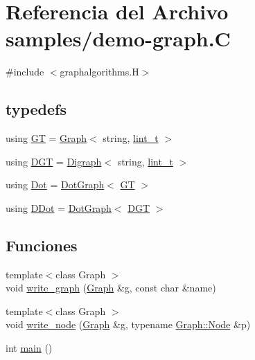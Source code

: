 \hypertarget{demo-graph_8_c}{}\section{Referencia del Archivo samples/demo-\/graph.C}
\label{demo-graph_8_c}
{\ttfamily \#include $<$graphalgorithms.\+H$>$}\newline
\subsection*{typedefs}
\begin{DoxyCompactItemize}
\item 
using \hyperlink{demo-graph_8_c_aa29146ba261a2a26fce51cbd8557db3b}{GT} = \hyperlink{class_designar_1_1_graph}{Graph}$<$ string, \hyperlink{namespace_designar_a9d113d66a39e82b73727c72cd3a52f73}{lint\+\_\+t} $>$
\item 
using \hyperlink{demo-graph_8_c_a6b9eddfa4274f215240c1c90be9df2dc}{D\+GT} = \hyperlink{class_designar_1_1_digraph}{Digraph}$<$ string, \hyperlink{namespace_designar_a9d113d66a39e82b73727c72cd3a52f73}{lint\+\_\+t} $>$
\item 
using \hyperlink{demo-graph_8_c_a70657b0b48a4d69ef850be3c5517ecc2}{Dot} = \hyperlink{class_designar_1_1_dot_graph}{Dot\+Graph}$<$ \hyperlink{demo-buildgraph_8_c_a3001c40d2c31ca87ed96cd7d1334a55e}{GT} $>$
\item 
using \hyperlink{demo-graph_8_c_a0ffdd103a7285712ccbd9548ff5544e7}{D\+Dot} = \hyperlink{class_designar_1_1_dot_graph}{Dot\+Graph}$<$ \hyperlink{demo-buildgraph_8_c_ae73e956c2a8cf0a58255aa6b659985e0}{D\+GT} $>$
\end{DoxyCompactItemize}
\subsection*{Funciones}
\begin{DoxyCompactItemize}
\item 
{\footnotesize template$<$class Graph $>$ }\\void \hyperlink{demo-graph_8_c_a75dee8f1e6289c0fbd2060e643605bfe}{write\+\_\+graph} (\hyperlink{class_designar_1_1_graph}{Graph} \&g, const char \&name)
\item 
{\footnotesize template$<$class Graph $>$ }\\void \hyperlink{demo-graph_8_c_abe260b66e94b606f11fd75beedd0f6dc}{write\+\_\+node} (\hyperlink{class_designar_1_1_graph}{Graph} \&g, typename \hyperlink{class_designar_1_1_graph_a5dfc7dba9d092ac489c72e40390c37d0}{Graph\+::\+Node} \&p)
\item 
int \hyperlink{demo-graph_8_c_ae66f6b31b5ad750f1fe042a706a4e3d4}{main} ()
\end{DoxyCompactItemize}


